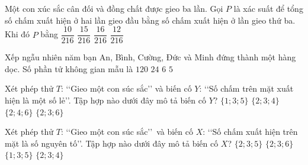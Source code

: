 \begin{ex}%
	Một con xúc sắc cân đối và đồng chất được gieo ba lần. Gọi $P$ là xác suất để tổng số chấm xuất hiện ở hai lần gieo đầu bằng số chấm xuất hiện ở lần gieo thứ ba. Khi đó $P$ bằng
	\choice
	{$\dfrac{10}{216}$}
	{\True $\dfrac{15}{216}$}
	{$\dfrac{16}{216}$}
	{$\dfrac{12}{216}$}
\end{ex}

\begin{ex}%
	Xếp ngẫu nhiên năm bạn An, Bình, Cường, Đức và Minh đứng  thành một hàng dọc. Số phần tử không gian mẫu là
	\choice
	{\True $120$}
	{$24$}
	{$6$}
	{$5$}	
\end{ex}
\begin{ex}%
	Xét phép thử $T$: \lq\lq Gieo một con súc sắc\rq\rq\;  và biến cố $Y$: \lq\lq Số chấm trên mặt xuất hiện là một số lẻ\rq\rq. Tập hợp nào dưới đây mô tả biến cố $Y$?
	\choice
	{\True $\{1;3;5\}$}
	{$\{2;3;4\}$}
	{$\{2;4;6\}$}
	{$\{2;3;6\}$}	
\end{ex}
\begin{ex}%
	Xét phép thử $T$: \lq\lq Gieo một con súc sắc\rq\rq\
	và  biến cố $X$: \lq\lq Số chấm xuất hiện trên mặt là số nguyên tố\rq\rq. Tập hợp nào dưới đây mô tả biến cố $X$?
	\choice
	{\True $\{2;3;5\}$}
	{$\{2;3;6\}$}
	{$\{1;3;5\}$}
	{$\{2;3;4\}$}	
\end{ex}


